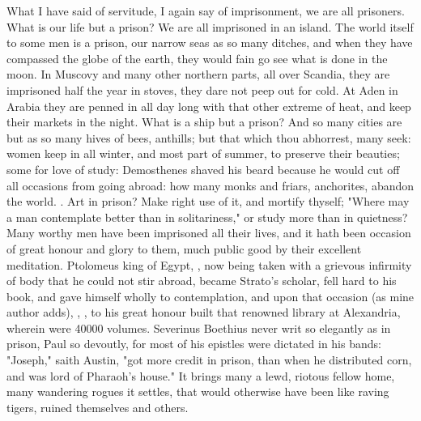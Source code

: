 {What I have said of servitude, I again say of imprisonment, we are all prisoners. What is our life but a prison? We are all imprisoned in an island. The world itself to some men is a prison, our narrow seas as so many ditches, and when they have compassed the globe of the earth, they would fain go see what is done in the moon. In Muscovy and many other northern parts, all over Scandia, they are imprisoned half the year in stoves, they dare not peep out for cold. At Aden in Arabia they are penned in all day long with that other extreme of heat, and keep their markets in the night. What is a ship but a prison? And so many cities are but as so many hives of bees, anthills; but that which thou abhorrest, many seek: women keep in all winter, and most part of summer, to preserve their beauties; some for love of study: Demosthenes shaved his beard because he would cut off all occasions from going abroad: how many monks and friars, anchorites, abandon the world. . Art in prison? Make right use of it, and mortify thyself; "Where may a man contemplate better than in solitariness," or study more than in quietness? Many worthy men have been imprisoned all their lives, and it hath been occasion of great honour and glory to them, much public good by their excellent meditation. Ptolomeus king of Egypt, , \etc{} now being taken with a grievous infirmity of body that he could not stir abroad, became Strato's scholar, fell hard to his book, and gave himself wholly to contemplation, and upon that occasion (as mine author adds), , \etc{}, to his great honour built that renowned library at Alexandria, wherein were 40\thinspace{}000 volumes. Severinus Boethius never writ so elegantly as in prison, Paul so devoutly, for most of his epistles were dictated in his bands: "Joseph," saith Austin, "got more credit in prison, than when he distributed corn, and was lord of Pharaoh's house." It brings many a lewd, riotous fellow home, many wandering rogues it settles, that would otherwise have been like raving tigers, ruined themselves and others.

}
